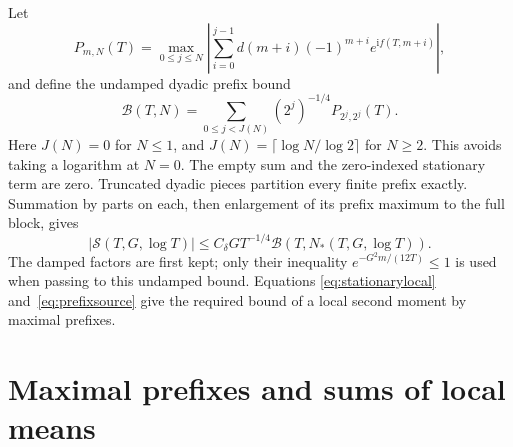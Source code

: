 \documentclass[11pt,a4paper]{article}
\numberwithin{equation}{section}
\theoremstyle{definition}
\newcommand{\ii}{\mathrm i}
\begin{document}
Let
\[
 P_{m,N}(T)=\max_{0\le j\le N}
           \left|\sum_{i=0}^{j-1}d(m+i)(-1)^{m+i}e^{\ii f(T,m+i)}\right|,
\]
and define the undamped dyadic prefix bound
\[
 \mathscr B(T,N)=\sum_{0\le j<J(N)}
                     (2^j)^{-1/4}P_{2^j,2^j}(T).
\]
Here $J(N)=0$ for $N\le1$, and
$J(N)=\lceil\log N/\log2\rceil$ for $N\ge2$.
This avoids taking a logarithm at $N=0$.
The empty sum and the zero-indexed stationary term are zero. Truncated dyadic
pieces partition every finite prefix exactly. Summation by parts on each,
then enlargement of its prefix maximum to the full block, gives
\begin{equation}\label{eq:prefixsource}
 |\mathcal S(T,G,\log T)|\le C_\delta GT^{-1/4}
           \mathscr B(T,N_*(T,G,\log T)).
\end{equation}
The damped factors are first kept; only their inequality $e^{-G^2m/(12T)}\le1$
is used when passing to this undamped bound. Equations \eqref{eq:stationarylocal} and~\eqref{eq:prefixsource} give the required
bound of a local second moment by maximal prefixes.


\section{Maximal prefixes and sums of local means}
\label{sec:sums}
\end{document}
